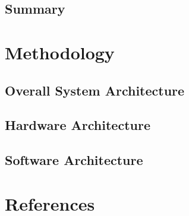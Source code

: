 \documentclass[12pt, a4paper]{article}
\begin{document}
\subsection{Summary}
\newpage

\section{Methodology}
\subsection{Overall System Architecture}
\subsection{Hardware Architecture}
\subsection{Software Architecture}
\newpage

\section{References}


\end{document}

